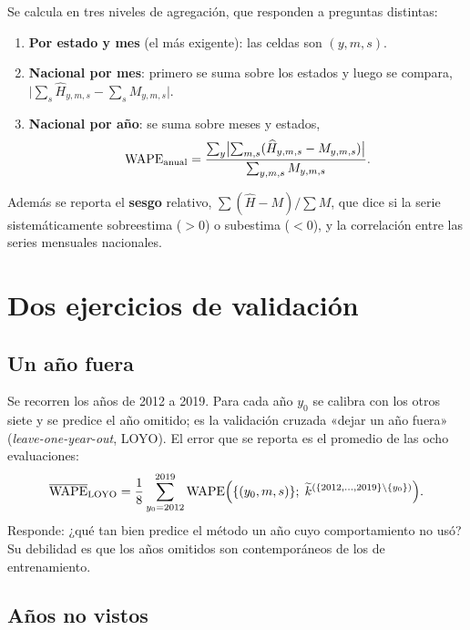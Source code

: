 Se calcula en tres niveles de agregación, que responden a preguntas distintas:

\begin{enumerate}[label=\arabic*)]
  \item \textbf{Por estado y mes} (el más exigente): las celdas son $(y,m,s)$.
  \item \textbf{Nacional por mes}: primero se suma sobre los estados y luego se compara, $\bigl|\sum_s\widehat H_{y,m,s}-\sum_sM_{y,m,s}\bigr|$.
  \item \textbf{Nacional por año}: se suma sobre meses y estados,
    \begin{align*}
      \operatorname{WAPE}_{\text{anual}}=\frac{\sum_y\bigl|\sum_{m,s}(\widehat H_{y,m,s}-M_{y,m,s})\bigr|}{\sum_{y,m,s}M_{y,m,s}}.
    \end{align*}
\end{enumerate}

Además se reporta el \textbf{sesgo} relativo, $\sum(\widehat H-M)/\sum M$, que dice si la serie sistemáticamente sobreestima ($>0$) o subestima ($<0$), y la correlación entre las series mensuales nacionales.

\section{Dos ejercicios de validación}

\subsection{Un año fuera}

Se recorren los años de 2012 a 2019. Para cada año $y_0$ se calibra con los otros siete y se predice el año omitido; es la validación cruzada «dejar un año fuera» (\emph{leave-one-year-out}, LOYO). El error que se reporta es el promedio de las ocho evaluaciones:
\begin{align*}
  \overline{\operatorname{WAPE}}_{\mathrm{LOYO}}=\frac{1}{8}\sum_{y_0=2012}^{2019}\operatorname{WAPE}\Bigl(\{(y_0,m,s)\};\;\widetilde k^{(\{2012,\dots,2019\}\setminus\{y_0\})}\Bigr).
\end{align*}
Responde: ¿qué tan bien predice el método un año cuyo comportamiento no usó? Su debilidad es que los años omitidos son contemporáneos de los de entrenamiento.

\subsection{Años no vistos}

